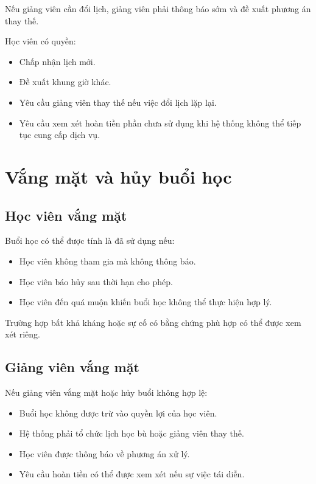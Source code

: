 \documentclass[12pt,a4paper]{article}
\begin{document}
Nếu giảng viên cần đổi lịch, giảng viên phải thông báo sớm
và đề xuất phương án thay thế.

Học viên có quyền:

\begin{itemize}
    \item Chấp nhận lịch mới.
    \item Đề xuất khung giờ khác.
    \item Yêu cầu giảng viên thay thế nếu việc đổi lịch lặp lại.
    \item Yêu cầu xem xét hoàn tiền phần chưa sử dụng khi hệ thống
    không thể tiếp tục cung cấp dịch vụ.
\end{itemize}

\section{Vắng mặt và hủy buổi học}

\subsection{Học viên vắng mặt}

Buổi học có thể được tính là đã sử dụng nếu:

\begin{itemize}
    \item Học viên không tham gia mà không thông báo.
    \item Học viên báo hủy sau thời hạn cho phép.
    \item Học viên đến quá muộn khiến buổi học không thể thực hiện hợp lý.
\end{itemize}

Trường hợp bất khả kháng hoặc sự cố có bằng chứng phù hợp
có thể được xem xét riêng.

\subsection{Giảng viên vắng mặt}

Nếu giảng viên vắng mặt hoặc hủy buổi không hợp lệ:

\begin{itemize}
    \item Buổi học không được trừ vào quyền lợi của học viên.
    \item Hệ thống phải tổ chức lịch học bù hoặc giảng viên thay thế.
    \item Học viên được thông báo về phương án xử lý.
    \item Yêu cầu hoàn tiền có thể được xem xét nếu sự việc tái diễn.
\end{itemize}
\end{document}
